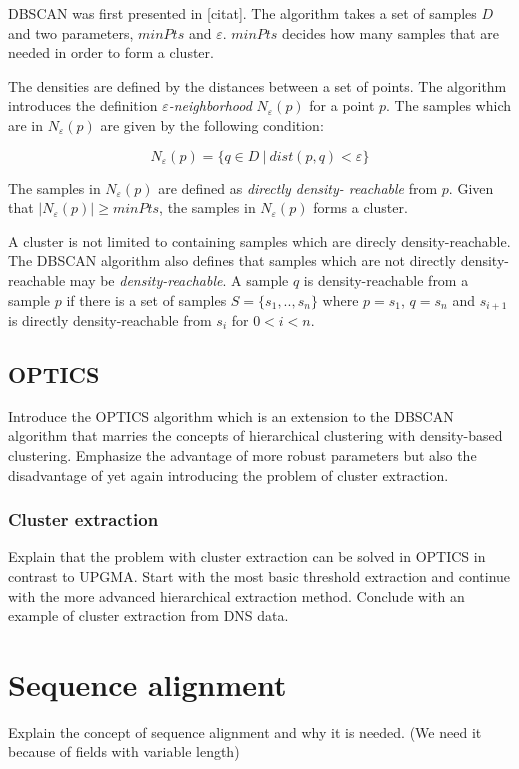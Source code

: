 \documentclass[a4paper]{report}
\begin{document}
DBSCAN was first presented in [citat]. The algorithm takes a set of samples
$D$ and two parameters, $minPts$ and $\varepsilon$. $minPts$ decides how many
samples that are needed in order to form a cluster.

The densities are defined by the distances between a set of points.
The algorithm introduces the definition \emph{$\varepsilon$-neighborhood}
$N_{\varepsilon}(p)$ for a point $p$. The samples which are in 
$N_{\varepsilon}(p)$ are given by the following condition:

\begin{equation}
    N_{\varepsilon}(p) = \{ q \in D ~|~ dist(p,q) < \varepsilon  \}
    \label{eq:eps}
\end{equation}

The samples in $N_{\varepsilon}(p)$ are defined as \emph{directly density-
reachable} from $p$. Given that $|N_{\varepsilon}(p)| \ge minPts$, the samples in
$N_{\varepsilon}(p)$ forms a cluster. 

A cluster is not limited to containing samples which are direcly
density-reachable. The DBSCAN algorithm also defines that samples which are
not directly density-reachable may be \emph{density-reachable}.
A sample $q$ is density-reachable from a sample $p$ if there is a set of samples
$S = \{s_1, .., s_n\}$ where $p = s_1$, $q = s_n$ and $s_{i+1}$ is directly
density-reachable from $s_i$ for $0 < i < n$.

\subsection{OPTICS}
Introduce the OPTICS algorithm which is an extension to the DBSCAN algorithm
that marries the concepts of hierarchical clustering with density-based
clustering. Emphasize the advantage of more robust parameters but also the
disadvantage of yet again introducing the problem of cluster extraction.

\subsubsection{Cluster extraction}
Explain that the problem with cluster extraction can be solved in OPTICS in
contrast to UPGMA. Start with the most basic threshold extraction and continue
with the more advanced hierarchical extraction method. Conclude with an example
of cluster extraction from DNS data.

\section{Sequence alignment}
Explain the concept of sequence alignment and why it is needed. (We need it
because of fields with variable length)
\end{document}
